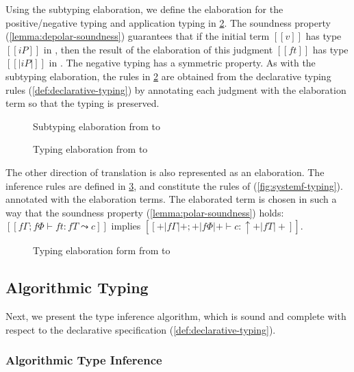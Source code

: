 Using the subtyping elaboration, we define the elaboration for the
positive/negative typing and application typing in
\cref{fig:typing-elaboration}.
The soundness property (\cref{lemma:depolar-soundness})
guarantees that if the initial term $[[v]]$ has type $[[iP]]$ in \fexists,
then the result of the elaboration of this judgment $[[ft]]$ has
type $[[|iP|]]$ in \systemf. The negative typing has a symmetric property.
As with the subtyping elaboration, 
the rules in \cref{fig:typing-elaboration} are obtained from 
the \fexists declarative typing rules (\cref{def:declarative-typing})
by annotating each judgment with the elaboration term
so that the typing is preserved.

\begin{figure}[t]
  \ottdefnELLabeled[\apppref]
  \caption{Subtyping elaboration from \fexists to \systemf}
  \label{fig:subt-elaboration}
\end{figure}

\clearpage
\begin{figure}[t]
  \ottdefnTELNLabeledTwoColumns[\apppref]{}

  \ottdefnTELPAppLabeled[\apppref]{}
  \caption{Typing elaboration from \fexists to \systemf}
  \label{fig:typing-elaboration}
\end{figure}
\clearpage

The other direction of translation is also represented as an elaboration. The
inference rules are defined in \cref{fig:systemf-polarization}, and constitute
the rules of \systemf (\cref{fig:systemf-typing}). annotated with the
elaboration terms. The elaborated term is chosen in such a way that
the soundness property (\cref{lemma:polar-soundness}) holds: 
$[[fΓ ; fΦ ⊢ ft : fT ⤳ c]]$ implies $[[+|fΓ|+ ; +|fΦ|+ ⊢ c : ↑+|fT|+]]$.

\begin{figure}[t]
  \ottdefnELfPolLabeled[\apppref]{}
  \caption{Typing elaboration form from \systemf to \fexists}
  \label{fig:systemf-polarization}
\end{figure}

\subsection{Algorithmic Typing}

Next, we present the type inference algorithm, 
which is sound and complete with respect to the declarative specification
(\cref{def:declarative-typing}).

\subsubsection{Algorithmic Type Inference}

